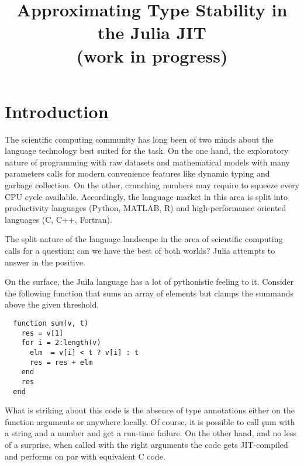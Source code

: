 \documentclass[sigplan,screen]{acmart}
\begin{document}
\title[Approximating Type Stability in the Julia JIT (work in progress)]%
{Approximating Type Stability in the Julia JIT\\(work in progress)}



\maketitle

\section{Introduction}

The scientific computing community has long been of two minds about the language
technology best suited for the task. On the one hand, the exploratory nature of
programming with raw datasets and mathematical models with many parameters calls
for modern convenience features like dynamic typing and garbage collection. On
the other, crunching numbers may require to squeeze every CPU cycle available.
Accordingly, the language market in this area is split into productivity
languages (Python, MATLAB, R) and high-performance oriented languages (C,
C++, Fortran).

The split nature of the language landscape in the area of scientific
computing calls for a question: can we have the best of both worlds? Julia
attempts to answer in the positive.

On the surface, the Juila language has a lot of pythonistic feeling to it.
Consider the following function that sums an array of elements but clamps the
summands above the given threshold.
%
\begin{lstlisting}
  function sum(v, t)
    res = v[1]
    for i = 2:length(v)
      elm  = v[i] < t ? v[i] : t
      res = res + elm
    end
    res
  end
\end{lstlisting}
%
What is striking about this code is the absence of type annotations either on the
function arguments or anywhere locally. Of course, it is possible to call
\c{sum} with a string and a number and get a run-time failure. On the other hand,
and no less of a surprise, when called with the right arguments the code gets
JIT-compiled and performs on par with equivalent C code.
\end{document}
